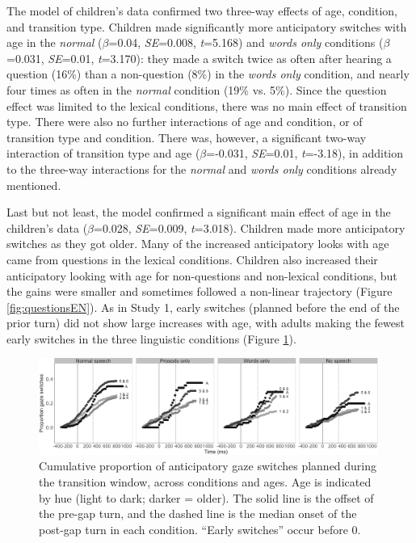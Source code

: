 \documentclass[authoryear, 12pt]{elsarticle}
\begin{document}
The model of children's data confirmed two three-way effects of age, condition, and transition type. Children made significantly more anticipatory switches with age in the \textit{normal} (\textit{$\beta$}=0.04, \textit{SE}=0.008, \textit{t}=5.168) and \textit{words only} conditions (\textit{$\beta$}=0.031, \textit{SE}=0.01, \textit{t}=3.170): they made a switch twice as often after hearing a question (16\%) than a non-question (8\%) in the \textit{words only} condition, and nearly four times as often in the \textit{normal} condition (19\% vs. 5\%). Since the question effect was limited to the lexical conditions, there was no main effect of transition type. There were also no further interactions of age and condition, or of transition type and condition. There was, however, a significant two-way interaction of transition type and age (\textit{$\beta$}=-0.031, \textit{SE}=0.01, \textit{t}=-3.18), in addition to the three-way interactions for the \textit{normal} and \textit{words only} conditions already mentioned.

Last but not least, the model confirmed a significant main effect of age in the children's data (\textit{$\beta$}=0.028, \textit{SE}=0.009, \textit{t}=3.018). Children made more anticipatory switches as they got older. Many of the increased anticipatory looks with age came from questions in the lexical conditions. Children also increased their anticipatory looking with age for non-questions and non-lexical conditions, but the gains were smaller and sometimes followed a non-linear trajectory (Figure \ref{fig:questionsEN}). As in Study 1, early switches (planned before the end of the prior turn) did not show large increases with age, with adults making the fewest early switches in the three linguistic conditions (Figure \ref{fig:cumulativeEN}).

\begin{figure}[ht]
\begin{center}
\includegraphics[width=0.99\textwidth]{figures/FIG-cumulative-EN.png}
\end{center}
\caption{Cumulative proportion of anticipatory gaze switches planned during the transition window, across conditions and ages. Age is indicated by hue (light to dark; darker = older). The solid line is the offset of the pre-gap turn, and the dashed line is the median onset of the post-gap turn in each condition. ``Early switches'' occur before 0.} 
\label{fig:cumulativeEN}
\end{figure}
\end{document}
